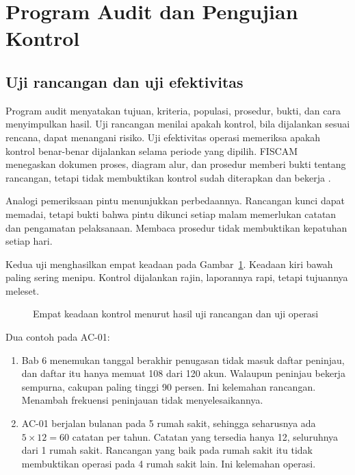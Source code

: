 \section{Program Audit dan Pengujian Kontrol}

\subsection*{Uji rancangan dan uji efektivitas}

Program audit menyatakan tujuan, kriteria, populasi, prosedur, bukti, dan cara menyimpulkan hasil.
Uji rancangan menilai apakah kontrol, bila dijalankan sesuai rencana, dapat menangani risiko. Uji
efektivitas operasi memeriksa apakah kontrol benar-benar dijalankan selama periode yang dipilih.
FISCAM menegaskan dokumen proses, diagram alur, dan prosedur memberi bukti tentang rancangan,
tetapi tidak membuktikan kontrol sudah diterapkan dan bekerja \cite{c12-fiscam2026}.

Analogi pemeriksaan pintu menunjukkan perbedaannya. Rancangan kunci dapat memadai, tetapi bukti
bahwa pintu dikunci setiap malam memerlukan catatan dan pengamatan pelaksanaan. Membaca prosedur
tidak membuktikan kepatuhan setiap hari.

Kedua uji menghasilkan empat keadaan pada Gambar~\ref{fig:ch12-rancangan-operasi}. Keadaan kiri
bawah paling sering menipu. Kontrol dijalankan rajin, laporannya rapi, tetapi tujuannya meleset.

\begin{figure}[!htb]
  \centering
  
  \caption{Empat keadaan kontrol menurut hasil uji rancangan dan uji operasi}
  \label{fig:ch12-rancangan-operasi}
\end{figure}

Dua contoh pada AC-01:
\begin{enumerate}
  \item Bab 6 menemukan tanggal berakhir penugasan tidak masuk daftar peninjau, dan daftar itu
  hanya memuat 108 dari 120 akun. Walaupun peninjau bekerja sempurna, cakupan paling tinggi 90
  persen. Ini kelemahan rancangan. Menambah frekuensi peninjauan tidak menyelesaikannya.
  \item AC-01 berjalan bulanan pada 5 rumah sakit, sehingga seharusnya ada $5 \times 12 = 60$
  catatan per tahun. Catatan yang tersedia hanya 12, seluruhnya dari 1 rumah sakit. Rancangan yang
  baik pada rumah sakit itu tidak membuktikan operasi pada 4 rumah sakit lain. Ini kelemahan
  operasi.
\end{enumerate}

